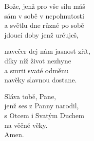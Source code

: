 \begin{translatioMulticol}{3}
Bože, jenž pro vše sílu máš\\
sám v sobě v nepohnutosti\\
a světlu dne různé po sobě\\
jdoucí doby jenž určuješ,\columnbreak

navečer dej nám jasnost zřít,\\
díky níž život nezhyne\\
a smrti svaté odměnu\\
navěky slavnou dostane.\columnbreak

Sláva tobě, Pane,\\
jenž ses z Panny narodil,\\
s Otcem i Svatým Duchem\\
na věčné věky.\\
Amen.
\end{translatioMulticol}
